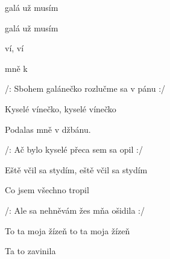 

\zs
{} galá  už musím   

 galá  už musím   

 ví,  ví 

 mně  k  
\ks

\zs
/: Sbohem galánečko rozlučme sa v pánu :/

Kyselé vínečko, kyselé vínečko 

Podalas mně v džbánu. 
\ks

\zs
/: Ač bylo kyselé přeca sem sa opil :/

Eště včil sa stydím, eště včil sa stydím 

Co jsem všechno tropil 
\ks

\zs
/: Ale sa nehněvám žes mňa ošidila :/

To ta moja žízeň to ta moja žízeň 

Ta to zavinila 
\ks
\kp

